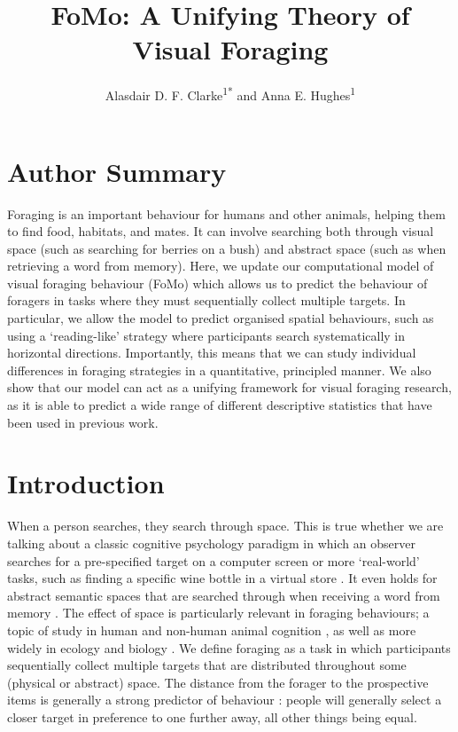 \documentclass[man, floatsintext]{apa7}
\title{FoMo: A Unifying Theory of Visual Foraging}
\author{Alasdair D. F. Clarke\textsuperscript{1*} and Anna E. Hughes\textsuperscript{1}}
\affiliation{\textsuperscript{1}Department of Psychology, University of Essex, Colchester, UK}
\begin{document}
\maketitle

\section*{Author Summary}
Foraging is an important behaviour for humans and other animals, helping them to find food, habitats, and mates. It can involve searching both through visual space (such as searching for berries on a bush) and abstract space (such as when retrieving a word from memory). Here, we update our computational model of visual foraging behaviour (FoMo) which allows us to predict the behaviour of foragers in tasks where they must sequentially collect multiple targets. In particular, we allow the model to predict organised spatial behaviours, such as using a `reading-like' strategy where participants search systematically in horizontal directions. Importantly, this means that we can study individual differences in foraging strategies in a quantitative, principled manner. We also show that our model can act as a unifying framework for visual foraging research, as it is able to predict a wide range of different descriptive statistics that have been used in previous work. 

\section{Introduction}

When a person searches, they search through space. This is true whether we are talking about a classic cognitive psychology paradigm in which an observer searches for a pre-specified target on a computer screen \citep{treisman1980} or more `real-world' tasks, such as finding a specific wine bottle in a virtual store \citep{zhao2017visual}. It even holds for abstract semantic spaces that are searched through when receiving a word from memory \citep{collins1975, hills2012optimal}. The effect of space is particularly relevant in foraging behaviours; a topic of study in human and non-human animal cognition \citep{bella2021}, as well as more widely in ecology and biology \citep{hills2015exploration}. We define foraging as a task in which participants sequentially collect multiple targets that are distributed throughout some (physical or abstract) space. The distance from the forager to the prospective items is generally a strong predictor of behaviour \citep{clarke2022foraging}: people will generally select a closer target in preference to one further away, all other things being equal.
\end{document}
